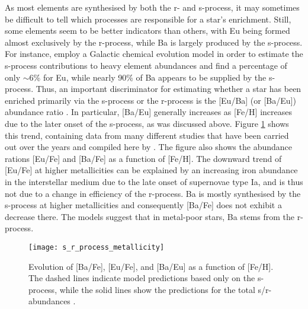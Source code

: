 \documentclass[a4paper,11pt]{article}
\begin{document}
%
As most elements are synthesised by both the r- and s-process, it may sometimes be difficult to tell which processes are responsible for a star's enrichment. Still, some elements seem to be better indicators than others, with Eu being formed almost exclusively by the r-process, while Ba is largely produced by the s-process. For instance, \citet{bisterzo14} employ a Galactic chemical evolution model in order to estimate the s-process contributions to heavy element abundances and find a percentage of only ${\sim}6$\% for Eu, while nearly 90\% of Ba appears to be supplied by the s-process. Thus, an important discriminator for estimating whether a star has been enriched primarily via the s-process or the r-process is the [Eu/Ba] (or [Ba/Eu]) abundance ratio \citep{battistini16,beers05,mashonkina01}. In particular, [Ba/Eu] generally increases as [Fe/H] increases due to the later onset of the s-process, as was discussed above. Figure \ref{fig:srprocess} shows this trend, containing data from many different studies that have been carried out over the years and compiled here by \citet{kappeler11}. The figure also shows the abundance rations [Eu/Fe] and [Ba/Fe] as a function of [Fe/H]. The downward trend of [Eu/Fe] at higher metallicities can be explained by an increasing iron abundance in the interstellar medium due to the late onset of supernovae type Ia, and is thus not due to a change in efficiency of the r-process. Ba is mostly synthesised by the s-process at higher metallicities and consequently [Ba/Fe] does not exhibit a decrease there. The models suggest that in metal-poor stars, Ba stems from the r-process.
%
\begin{figure}
 \centering
 \texttt{[image: s\_r\_process\_metallicity]}
 \caption[Ba and Eu abundances as function of metallicity]{Evolution of [Ba/Fe], [Eu/Fe], and [Ba/Eu] as a function of [Fe/H]. The dashed lines indicate model predictions based only on the s-process, while the solid lines show the predictions for the total s/r-abundances \citep{kappeler11}.}
 \label{fig:srprocess}
\end{figure}
%
\end{document}
